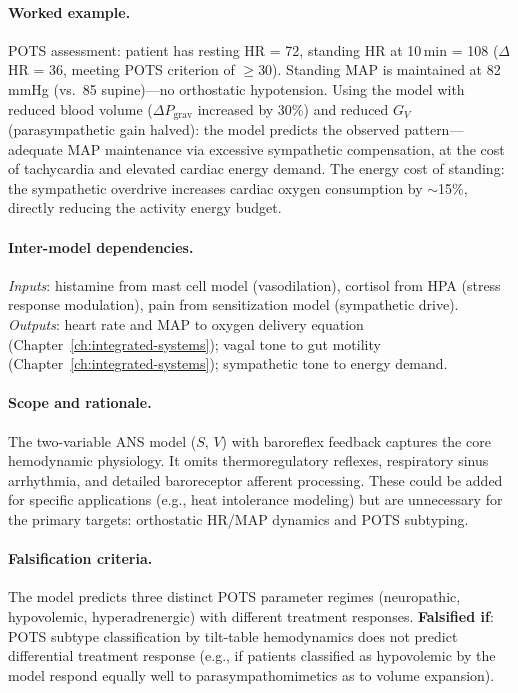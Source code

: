 \paragraph{Worked example.}
POTS assessment: patient has resting HR = 72, standing HR at 10\,min = 108 ($\Delta$HR = 36, meeting POTS criterion of $\geq$30). Standing MAP is maintained at 82\,mmHg (vs.\ 85 supine)---no orthostatic hypotension. Using the model with reduced blood volume ($\Delta P_{\text{grav}}$ increased by 30\%) and reduced $G_V$ (parasympathetic gain halved): the model predicts the observed pattern---adequate MAP maintenance via excessive sympathetic compensation, at the cost of tachycardia and elevated cardiac energy demand. The energy cost of standing: the sympathetic overdrive increases cardiac oxygen consumption by $\sim$15\%, directly reducing the activity energy budget.

\paragraph{Inter-model dependencies.}
\emph{Inputs}: histamine from mast cell model (vasodilation), cortisol from HPA (stress response modulation), pain from sensitization model (sympathetic drive). \emph{Outputs}: heart rate and MAP to oxygen delivery equation (Chapter~\ref{ch:integrated-systems}); vagal tone to gut motility (Chapter~\ref{ch:integrated-systems}); sympathetic tone to energy demand.

\paragraph{Scope and rationale.}
The two-variable ANS model ($S$, $V$) with baroreflex feedback captures the core hemodynamic physiology. It omits thermoregulatory reflexes, respiratory sinus arrhythmia, and detailed baroreceptor afferent processing. These could be added for specific applications (e.g., heat intolerance modeling) but are unnecessary for the primary targets: orthostatic HR/MAP dynamics and POTS subtyping.

\paragraph{Falsification criteria.}
The model predicts three distinct POTS parameter regimes (neuropathic, hypovolemic, hyperadrenergic) with different treatment responses. \textbf{Falsified if}: POTS subtype classification by tilt-table hemodynamics does not predict differential treatment response (e.g., if patients classified as hypovolemic by the model respond equally well to parasympathomimetics as to volume expansion).


